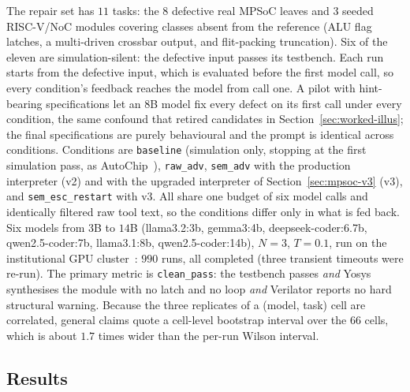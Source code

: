 \documentclass[11pt]{article}
\begin{document}
The repair set has $11$ tasks: the $8$ defective real MPSoC leaves and $3$
seeded RISC-V/NoC modules covering classes absent from the reference (ALU flag
latches, a multi-driven crossbar output, and flit-packing truncation). Six of
the eleven are simulation-silent: the defective input passes its testbench.
Each run starts from the defective input, which is evaluated before the first
model call, so every condition's feedback reaches the model from call one. A
pilot with hint-bearing specifications let an $8$B model fix every defect on
its first call under every condition, the same confound that retired
candidates in Section~\ref{sec:worked-illus}; the final specifications are
purely behavioural and the prompt is identical across conditions.
Conditions are \texttt{baseline} (simulation only, stopping at the first
simulation pass, as AutoChip~\cite{autochip}), \texttt{raw\_adv},
\texttt{sem\_adv} with the production interpreter (v2) and with the upgraded
interpreter of Section~\ref{sec:mpsoc-v3} (v3), and \texttt{sem\_esc\_restart}
with v3. All share one budget of six model calls and identically filtered raw
tool text, so the conditions differ only in what is fed back. Six models from
$3$B to $14$B (llama3.2:3b, gemma3:4b, deepseek-coder:6.7b, qwen2.5-coder:7b,
llama3.1:8b, qwen2.5-coder:14b), $N{=}3$, $T{=}0.1$, run on the institutional
GPU cluster~\cite{bitshpc}: $990$ runs, all completed (three transient
timeouts were re-run). The primary metric is \texttt{clean\_pass}: the
testbench passes \emph{and} Yosys synthesises the module with no latch and no
loop \emph{and} Verilator reports no hard structural warning. Because the
three replicates of a (model, task) cell are correlated, general claims quote
a cell-level bootstrap interval over the $66$ cells, which is about $1.7$ times
wider than the per-run Wilson interval.

\subsection{Results}
\label{sec:mpsoc-results}
\end{document}
